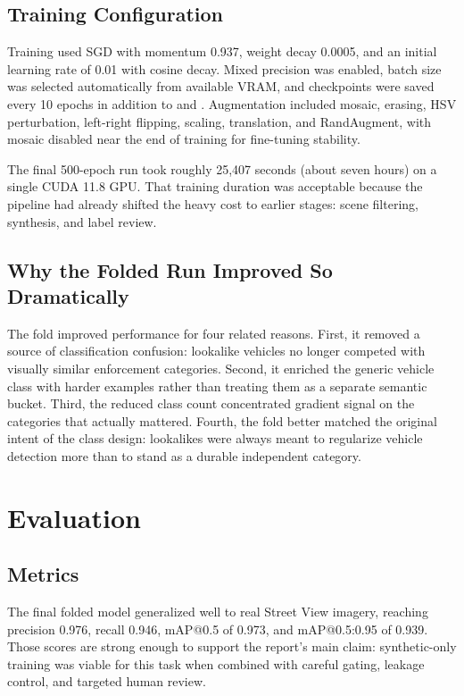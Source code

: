 \documentclass[12pt,a4paper]{article}
\newcommand{\fpath}[1]{\texttt{\detokenize{#1}}}
\begin{document}
\subsection{Training Configuration}

Training used SGD with momentum 0.937, weight decay 0.0005, and an initial learning rate of 0.01 with cosine decay. Mixed precision was enabled, batch size was selected automatically from available VRAM, and checkpoints were saved every 10 epochs in addition to \fpath{best.pt} and \fpath{last.pt}. Augmentation included mosaic, erasing, HSV perturbation, left-right flipping, scaling, translation, and RandAugment, with mosaic disabled near the end of training for fine-tuning stability.

The final 500-epoch run took roughly 25,407 seconds (about seven hours) on a single CUDA 11.8 GPU. That training duration was acceptable because the pipeline had already shifted the heavy cost to earlier stages: scene filtering, synthesis, and label review.

\subsection{Why the Folded Run Improved So Dramatically}

The fold improved performance for four related reasons. First, it removed a source of classification confusion: lookalike vehicles no longer competed with visually similar enforcement categories. Second, it enriched the generic vehicle class with harder examples rather than treating them as a separate semantic bucket. Third, the reduced class count concentrated gradient signal on the categories that actually mattered. Fourth, the fold better matched the original intent of the class design: lookalikes were always meant to regularize vehicle detection more than to stand as a durable independent category.

\section{Evaluation}

\subsection{Metrics}

The final folded model generalized well to real Street View imagery, reaching precision 0.976, recall 0.946, mAP@0.5 of 0.973, and mAP@0.5:0.95 of 0.939. Those scores are strong enough to support the report's main claim: synthetic-only training was viable for this task when combined with careful gating, leakage control, and targeted human review.
\end{document}
